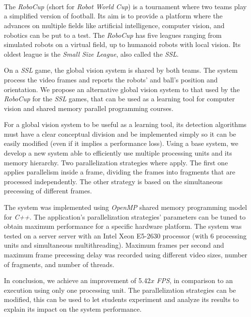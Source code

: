 \ \\
\ \\
\label{pagsumm}
\\
\ \\
\ \\

\ \\

\ \\
\ \\

The \emph{RoboCup} (short for \emph{Robot World Cup}) is a tournament where two
teams play a simplified version of football. Its aim is to provide a platform
where the advances on multiple fields like artificial intelligence, computer
vision, and robotics can be put to a test. The \emph{RoboCup} has five leagues
ranging from simulated robots on a virtual field, up to humanoid robots with
local vision. Its oldest league is the \emph{Small Size League}, also called the
\emph{SSL}.

On a \emph{SSL} game, the global vision system is shared by both teams. The
system process the video frames and reports the robots' and ball's position and
orientation. We propose an alternative global vision system to that used by the
\emph{RoboCup} for the \emph{SSL} games, that can be used as a learning tool for
computer vision and shared memory parallel programming courses.

For a global vision system to be useful as a learning tool, its detection
algorithms must have a clear conceptual division and be implemented simply so it
can be easily modified (even if it implies a performance loss). Using a base
system, we develop a new system able to efficiently use multiple processing
units and its memory hierarchy. Two parallelization strategies where apply. The
first one applies parallelism inside a frame, dividing the frames into fragments
that are processed independently. The other strategy is based on the
simultaneous precessing of different frames.

The system was implemented using \emph{OpenMP} shared memory programming model
for \emph{C++}. The application's parallelization strategies' parameters can be
tuned to obtain maximum performance for a specific hardware platform. The system
was tested on a server server with an Intel Xeon E5-2630 processor (with 6
processing units and simultaneous multithreading). Maximum frames per second and
maximum frame precessing delay was recorded using different video sizes, number
of fragments, and number of threads.

In conclusion, we achieve an improvement of 5.42$x$ \emph{FPS}, in comparison to
an execution using only one processing unit. The parallelization strategies can
be modified, this can be used to let students experiment and analyze its results
to explain its impact on the system performance.

\vfill
\pagebreak
